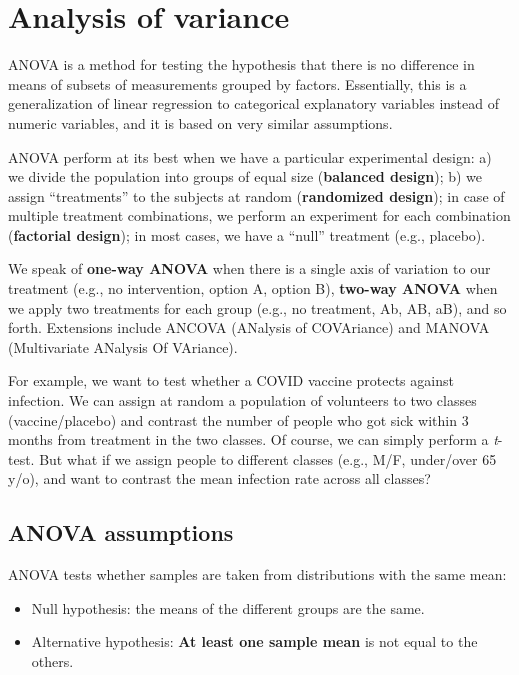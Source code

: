 \documentclass[
  letterpaper,
  DIV=11,
  numbers=noendperiod]{scrreprt}
\providecommand{\tightlist}{%
  \setlength{\itemsep}{0pt}\setlength{\parskip}{0pt}}\usepackage{longtable,booktabs,array}
\begin{document}
\hypertarget{analysis-of-variance}{%
\section{Analysis of variance}\label{analysis-of-variance}}

ANOVA is a method for testing the hypothesis that there is no difference
in means of subsets of measurements grouped by factors. Essentially,
this is a generalization of linear regression to categorical explanatory
variables instead of numeric variables, and it is based on very similar
assumptions.

ANOVA perform at its best when we have a particular experimental design:
a) we divide the population into groups of equal size (\textbf{balanced
design}); b) we assign ``treatments'' to the subjects at random
(\textbf{randomized design}); in case of multiple treatment
combinations, we perform an experiment for each combination
(\textbf{factorial design}); in most cases, we have a ``null'' treatment
(e.g., placebo).

We speak of \textbf{one-way ANOVA} when there is a single axis of
variation to our treatment (e.g., no intervention, option A, option B),
\textbf{two-way ANOVA} when we apply two treatments for each group
(e.g., no treatment, Ab, AB, aB), and so forth. Extensions include
ANCOVA (ANalysis of COVAriance) and MANOVA (Multivariate ANalysis Of
VAriance).

For example, we want to test whether a COVID vaccine protects against
infection. We can assign at random a population of volunteers to two
classes (vaccine/placebo) and contrast the number of people who got sick
within 3 months from treatment in the two classes. Of course, we can
simply perform a \emph{t}-test. But what if we assign people to
different classes (e.g., M/F, under/over 65 y/o), and want to contrast
the mean infection rate across all classes?

\hypertarget{anova-assumptions}{%
\subsection{ANOVA assumptions}\label{anova-assumptions}}

ANOVA tests whether samples are taken from distributions with the same
mean:

\begin{itemize}
\tightlist
\item
  Null hypothesis: the means of the different groups are the same.
\item
  Alternative hypothesis: \textbf{At least one sample mean} is not equal
  to the others.
\end{itemize}
\end{document}
